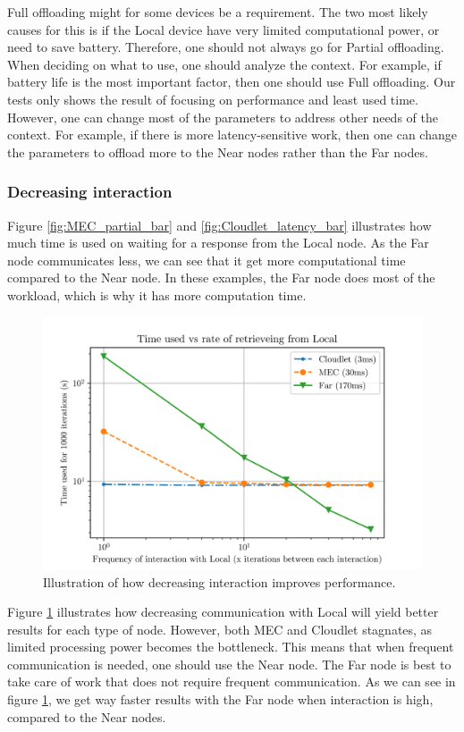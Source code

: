 Full offloading might for some devices be a requirement. The two most likely causes for this is if the Local device have very limited computational power, or need to save battery. Therefore, one should not always go for Partial offloading. When deciding on what to use, one should analyze the context. For example, if battery life is the most important factor, then one should use Full offloading. Our tests only shows the result of focusing on performance and least used time. However, one can change most of the parameters to address other needs of the context. For example, if there is more latency-sensitive work, then one can change the parameters to offload more to the Near nodes rather than the Far nodes.



\subsubsection{Decreasing interaction}
Figure \ref{fig:MEC_partial_bar} and \ref{fig:Cloudlet_latency_bar} illustrates how much time is used on waiting for a response from the Local node. As the Far node communicates less, we can see that it get more computational time compared to the Near node. In these examples, the Far node does most of the workload, which is why it has more computation time.


\begin{figure}
    \centering
    \includegraphics{chapters/6_evaluation/figures/All_latency.png}
    \caption{Illustration of how decreasing interaction improves performance.}
    \label{fig:all_graph_decrease}
\end{figure}

Figure \ref{fig:all_graph_decrease} illustrates how decreasing communication with Local will yield better results for each type of node. However, both MEC and Cloudlet stagnates, as limited processing power becomes the bottleneck. This means that when frequent communication is needed, one should use the Near node. The Far node is best to take care of work that does not require frequent communication. As we can see in figure \ref{fig:all_graph_decrease}, we get way faster results with the Far node when interaction is high, compared to the Near nodes.





